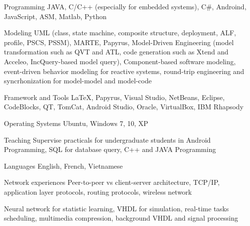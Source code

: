 


\begin{cvskills}


\cvskill
{Programming} %
{JAVA, C/C++ (especially for embedded systems), C\#, Androind, JavaScript, ASM, Matlab, Python} %


\cvskill
{Modeling}
{UML (class, state machine, composite structure, deployment, ALF, profile, PSCS, PSSM), MARTE, Papyrus, Model-Driven Engineering (model transformation such as QVT and ATL, code generation  such as Xtend and Acceleo, IncQuery-based model query), Component-based software modeling, event-driven behavior modeling for reactive systems, round-trip engineering and syncrhonization for model-model and model-code}

\cvskill
{Framework and Tools} %
{LaTeX, Papyrus, Visual Studio, NetBeans, Eclipse, CodeBlocks, QT, TomCat, Android Studio, Oracle, VirtualBox, IBM Rhapsody} %


\cvskill
{Operating Systems} %
{Ubuntu, Windows 7, 10, XP} %

\cvskill
{Teaching}
{Supervise practicals for undergraduate students in Android Programming, SQL for database query, C++ and JAVA Programming}

\cvskill
{Languages} %
{English, French, Vietnamese} %

\cvskill
{Network experiences}
{Peer-to-peer vs client-server architecture, TCP/IP, application layer protocols, routing protocols, wireless network}

{Neural network for statistic learning, VHDL for simulation, real-time tasks scheduling, multimedia compression, background VHDL and signal processing}


\end{cvskills}